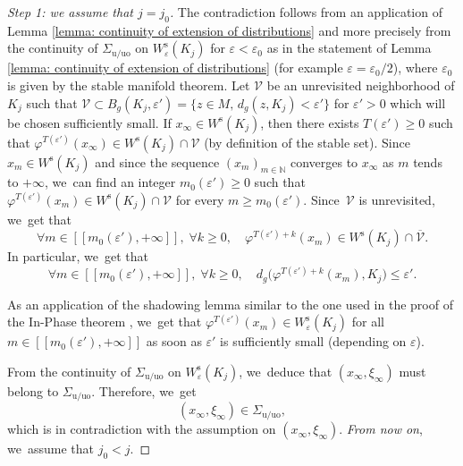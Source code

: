 \documentclass[11pt]{article}
\newcommand{\lcr}{[\![}
\newcommand{\rcr}{]\!]}
\newcommand{\rs}{\mathrm{s}}
\newcommand{\ru}{\mathrm{u}}
\newcommand{\ruo}{\mathrm{uo}}
\theoremstyle{definition}
\theoremstyle{plain}
\newcommand{\N}{\mathbb{N}}
\newcommand{\Vcal}{\mathcal{V}}
\begin{document}
\begin{proof}[Step 1: we assume that $j = j_0$]
The contradiction follows from an application of Lemma \ref{lemma: continuity of extension of distributions} and more precisely from the continuity of $\Sigma_{\ru/\ruo}$ on $W_{\varepsilon}^\rs (K_j)$ for $\varepsilon < \varepsilon_0$ as in the statement of Lemma \ref{lemma: continuity of extension of distributions} (for example $\varepsilon = \varepsilon_0/2$), where $\varepsilon_0$ is given by the stable manifold theorem. Let $\Vcal$ be an unrevisited neighborhood of $K_j$ such that $\Vcal \subset B_g (K_j, \varepsilon') = \{z \in M,\, d_g (z, K_j) < \varepsilon' \}$ for $\varepsilon' > 0$ which will be chosen sufficiently small. If $x_{\infty} \in W^\rs (K_j)$, then there exists $T(\varepsilon') \geq 0$ such that $\varphi^{T (\varepsilon')} (x_{\infty}) \in W^\rs (K_j) \cap \Vcal$ (by definition of the stable set).
Since $x_m \in W^\rs (K_j)$ and since the sequence $(x_m)_{m \in \N}$ converges to $x_{\infty}$ as $m$ tends to $+\infty$, we~can find an integer $m_0 (\varepsilon') \geq 0$ such that $\varphi^{T(\varepsilon')} (x_m) \in W^\rs (K_j) \cap \Vcal$ for every $m \geq m_0 (\varepsilon')$. Since~$\Vcal$ is unrevisited, we~get that
\[
\forall m \in \lcr m_0 (\varepsilon'), +\infty \rcr,\;\forall k \geq 0, \quad \varphi^{T(\varepsilon') + k} (x_m) \in W^\rs (K_j) \cap \overline{\Vcal}.
\]
In particular, we~get that
\[
\forall m \in \lcr m_0 (\varepsilon'), +\infty \rcr,\; \forall k \geq 0, \quad d_g \bigl(\varphi^{T(\varepsilon') + k} (x_m), K_j \bigr) \leq \varepsilon'.
\]

As an application of the shadowing lemma \cite[Th.\,5.3.3]{FH} similar to the one used in the proof of the In-Phase theorem \cite[Th.\,5.3.25]{FH}, we~get that $\varphi^{T(\varepsilon')} (x_m) \in W_{\varepsilon}^\rs (K_j)$ for all $m \in \lcr m_0 (\varepsilon'), +\infty \rcr$ as soon as $\varepsilon'$ is sufficiently small (depending on $\varepsilon$).

From the continuity of $\Sigma_{\ru/\ruo}$ on $W_{\varepsilon}^\rs (K_j)$, we~deduce that $(x_{\infty}, \xi_{\infty})$ must belong to $\Sigma_{\ru/\ruo}$. Therefore, we~get
\[
(x_{\infty}, \xi_{\infty}) \in \Sigma_{\ru/\ruo},
\]
which is in contradiction with the assumption on $(x_{\infty}, \xi_{\infty})$. \emph{From now on}, we~assume that
$j_0 < j$.


\end{proof}
\end{document}
